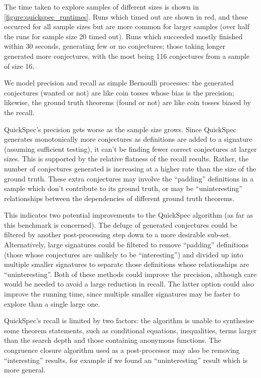 The time taken to explore samples of different sizes is shown in
\ref{figure:quickspec_runtimes}. Runs which timed out are shown in red, and
these occurred for all sample sizes but are more common for larger samples (over
half the runs for sample size 20 timed out). Runs which succeeded mostly
finished within 30 seconds, generating few or no conjectures; those taking
longer generated more conjectures, with the most being 116 conjectures from a
sample of size 16.

We model precision and recall as simple Bernoulli processes: the generated
conjectures (wanted or not) are like coin tosses whose bias is the precision;
likewise, the ground truth theorems (found or not) are like coin tosses biased
by the recall.

QuickSpec's precision gets worse as the sample size grows. Since QuickSpec
generates monotonically more conjectures as definitions are added to a signature
(assuming sufficient testing), it can't be finding fewer correct conjectures at
larger sizes. This is supported by the relative flatness of the recall results.
Rather, the number of conjectures generated is increasing at a higher rate than
the size of the ground truth. These extra conjectures may involve the
``padding'' definitions in a sample which don't contribute to its ground truth,
or may be ``uninteresting'' relationships between the dependencies of different
ground truth theorems.

This indicates two potential improvements to the QuickSpec algorithm (as far as
this benchmark is concerned). The deluge of generated conjectures could be
filtered by another post-processing step down to a more desirable sub-set.
Alternatively, large signatures could be filtered to remove ``padding''
definitions (those whose conjectures are unlikely to be ``interesting'') and
divided up into multiple smaller signatures to separate those definitions whose
relationships are ``uninteresting''. Both of these methods could improve the
precision, although care would be needed to avoid a large reduction in recall.
The latter option could also improve the running time, since multiple smaller
signatures may be faster to explore than a single large one.

QuickSpec's recall is limited by two factors: the algorithm is unable to
synthesise some theorem statements, such as conditional equations, inequalities,
terms larger than the search depth and those containing anonymous functions.
The congruence closure algorithm used as a post-processor may also be removing
``interesting'' results, for example if we found an ``uninteresting'' result
which is more general.

